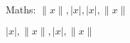 \documentclass{article}
\begin{document}
Maths:
\(\|x\|, |x|, | x |, \| x \|\)%

\(|x|, \|x\|, | x |, \| x \|\)%
\end{document}
